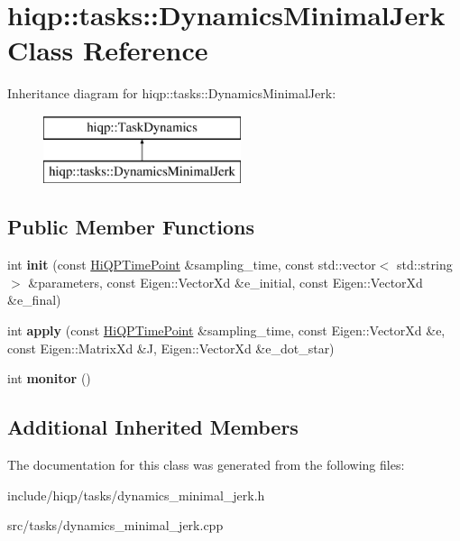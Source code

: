 \hypertarget{classhiqp_1_1tasks_1_1DynamicsMinimalJerk}{\section{hiqp\-:\-:tasks\-:\-:Dynamics\-Minimal\-Jerk Class Reference}
\label{classhiqp_1_1tasks_1_1DynamicsMinimalJerk}
}
Inheritance diagram for hiqp\-:\-:tasks\-:\-:Dynamics\-Minimal\-Jerk\-:\begin{figure}[H]
\begin{center}
\leavevmode
\includegraphics[height=2.000000cm]{classhiqp_1_1tasks_1_1DynamicsMinimalJerk}
\end{center}
\end{figure}
\subsection*{Public Member Functions}
\begin{DoxyCompactItemize}
\item 
\hypertarget{classhiqp_1_1tasks_1_1DynamicsMinimalJerk_a0f21e6b80b0b9b035f59b5a975623586}{int {\bfseries init} (const \hyperlink{classhiqp_1_1HiQPTimePoint}{Hi\-Q\-P\-Time\-Point} \&sampling\-\_\-time, const std\-::vector$<$ std\-::string $>$ \&parameters, const Eigen\-::\-Vector\-Xd \&e\-\_\-initial, const Eigen\-::\-Vector\-Xd \&e\-\_\-final)}\label{classhiqp_1_1tasks_1_1DynamicsMinimalJerk_a0f21e6b80b0b9b035f59b5a975623586}

\item 
\hypertarget{classhiqp_1_1tasks_1_1DynamicsMinimalJerk_a420b661063d27120ed6a519d6e1e4333}{int {\bfseries apply} (const \hyperlink{classhiqp_1_1HiQPTimePoint}{Hi\-Q\-P\-Time\-Point} \&sampling\-\_\-time, const Eigen\-::\-Vector\-Xd \&e, const Eigen\-::\-Matrix\-Xd \&J, Eigen\-::\-Vector\-Xd \&e\-\_\-dot\-\_\-star)}\label{classhiqp_1_1tasks_1_1DynamicsMinimalJerk_a420b661063d27120ed6a519d6e1e4333}

\item 
\hypertarget{classhiqp_1_1tasks_1_1DynamicsMinimalJerk_a9f5ac9dbec64cb628d68f0d8ac6d78cd}{int {\bfseries monitor} ()}\label{classhiqp_1_1tasks_1_1DynamicsMinimalJerk_a9f5ac9dbec64cb628d68f0d8ac6d78cd}

\end{DoxyCompactItemize}
\subsection*{Additional Inherited Members}


The documentation for this class was generated from the following files\-:\begin{DoxyCompactItemize}
\item 
include/hiqp/tasks/dynamics\-\_\-minimal\-\_\-jerk.\-h\item 
src/tasks/dynamics\-\_\-minimal\-\_\-jerk.\-cpp\end{DoxyCompactItemize}
